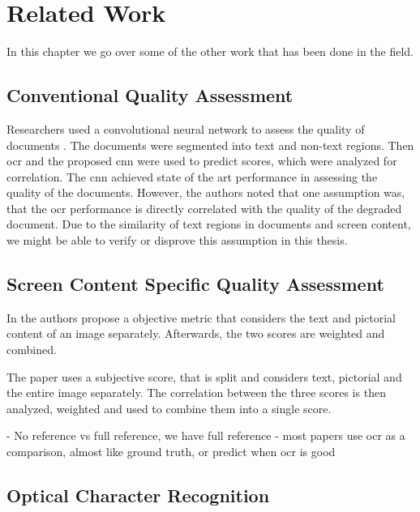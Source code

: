 \chapter{Related Work}
\label{chap:related_work}

In this chapter we go over some of the other work that has been done in the field.

\section{Conventional Quality Assessment}

Researchers used a convolutional neural network to assess the quality of documents \cite{ocr_cnn_docu_2014}.
The documents were segmented into text and non-text regions.
Then \gls{ocr} and the proposed \gls{cnn} were used to predict scores, which were analyzed for correlation.
The \gls{cnn} achieved state of the art performance in assessing the quality of the documents.
However, the authors noted that one assumption was, that the \gls{ocr} performance is directly correlated with the quality of the degraded document.
Due to the similarity of text regions in documents and screen content, we might be able to verify or disprove this assumption in this thesis.

\section{Screen Content Specific Quality Assessment}

In \cite{text_pict_weight_2017} the authors propose a objective metric that considers the text and pictorial content of an image separately.
Afterwards, the two scores are weighted and combined.

The paper \cite{3_subj_weight_2015} uses a subjective score, that is split and considers text, pictorial and the entire image separately.
The correlation between the three scores is then analyzed, weighted and used to combine them into a single score.

- No reference vs full reference, we have full reference
- most papers use ocr as a comparison, almost like ground truth, or predict when ocr is good


\section{Optical Character Recognition}

\cite{ocr_survey_2017}

